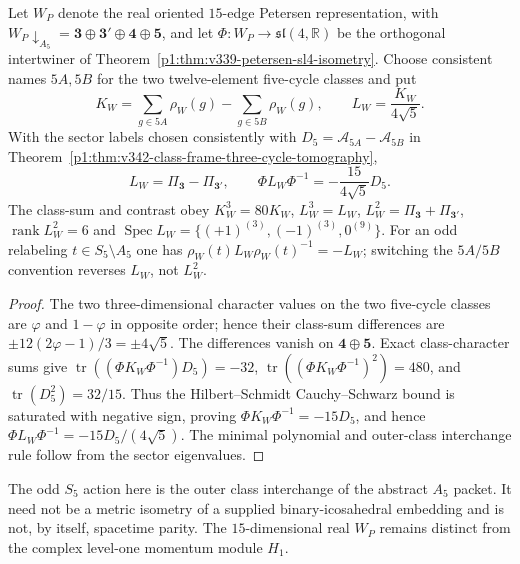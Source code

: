 \documentclass[11pt]{article}
\begin{document}
\begin{proposition}
\label{p1:prop:v343-fivefold-signed-contrast}
Let $W_P$ denote the real oriented $15$-edge Petersen representation,
with $W_P\downarrow_{A_5}=\mathbf3\oplus\mathbf3'\oplus\mathbf4\oplus\mathbf5$,
and let $\Phi:W_P\rightarrow\mathfrak{sl}(4,\mathbb R)$ be the
orthogonal intertwiner of Theorem~\ref{p1:thm:v339-petersen-sl4-isometry}.
Choose consistent names $5A,5B$ for the two twelve-element
five-cycle classes and put
\[
 K_W=\sum_{g\in5A}\rho_W(g)-\sum_{g\in5B}\rho_W(g),\qquad
 L_W=\frac{K_W}{4\sqrt5}.
\]
With the sector labels chosen consistently with $D_5=\mathcal A_{5A}-
\mathcal A_{5B}$ in
Theorem~\ref{p1:thm:v342-class-frame-three-cycle-tomography},
\[
 \boxed{L_W=\Pi_{\mathbf3}-\Pi_{\mathbf3'},\qquad
 \Phi L_W\Phi^{-1}=-\frac{15}{4\sqrt5}D_5.}
\]
The class-sum and contrast obey $K_W^3=80K_W$,
$L_W^3=L_W$, $L_W^2=\Pi_{\mathbf3}+\Pi_{\mathbf3'}$,
$\operatorname{rank}L_W^2=6$ and
$\operatorname{Spec}L_W=\{(+1)^{(3)},(-1)^{(3)},0^{(9)}\}$.
For an odd relabeling $t\in S_5\setminus A_5$ one has
$\rho_W(t)L_W\rho_W(t)^{-1}=-L_W$; switching the $5A/5B$
convention reverses $L_W$, not $L_W^2$.
\end{proposition}
\begin{proof}
The two three-dimensional character values on the two five-cycle
classes are $\varphi$ and $1-\varphi$ in opposite order; hence their
class-sum differences are $\pm 12(2\varphi-1)/3=\pm4\sqrt5$.
The differences vanish on $\mathbf4\oplus\mathbf5$.  Exact
class-character sums give $\operatorname{tr}((\Phi K_W\Phi^{-1})D_5)=-32$,
$\operatorname{tr}((\Phi K_W\Phi^{-1})^2)=480$, and
$\operatorname{tr}(D_5^2)=32/15$.  Thus the Hilbert--Schmidt
Cauchy--Schwarz bound is saturated with negative sign, proving
$\Phi K_W\Phi^{-1}=-15D_5$, and hence
$\Phi L_W\Phi^{-1}=-15D_5/(4\sqrt5)$.  The minimal polynomial
and outer-class interchange rule follow from the sector eigenvalues.
\end{proof}
\begin{remark}
\label{p1:rem:v343-fivefold-class-scope}
The odd $S_5$ action here is the outer class interchange of the
abstract $A_5$ packet.  It need not be a metric isometry of a supplied
binary-icosahedral embedding and is not, by itself, spacetime parity.
The $15$-dimensional real $W_P$ remains distinct from the complex
level-one momentum module $H_1$.
\end{remark}
\end{document}
